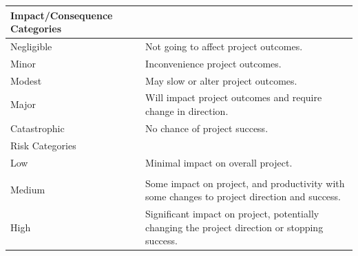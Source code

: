 \begin{appendices}
\begin{table}[H]
{\begin{tabular}{|p{4cm}|p{12cm}|}
        Impact/Consequence Categories & \\ \hline
        Negligible & Not going to affect project outcomes.\\
        Minor & Inconvenience project outcomes.\\
        Modest & May slow or alter project outcomes.\\
        Major & Will impact project outcomes and require change in direction.\\
        Catastrophic & No chance of project success.\\ \hline
        \hline
    
        Risk Categories & \\\hline
        \cellcolor[HTML]{D4FFD3}Low & Minimal impact on overall project. \\
        \cellcolor[HTML]{D4FFD3}  &  \\
        \cellcolor[HTML]{FFFFC7}Medium & Some impact on project, and productivity with some changes to project direction and success.\\
        \cellcolor[HTML]{FFCCC9}High & Significant impact on project, potentially changing the project direction or stopping success.\\
        \hline
    \end{tabular}
    }
\end{table}

\clearpage

\begin{landscape}


\end{landscape}
\end{appendices}
